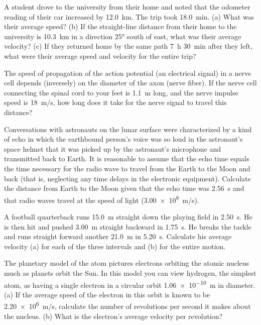 \documentclass[dvipsnames]{article}
\begin{document}
\begin{exercise}
    A student drove to the university from their home and noted that the odometer reading of their car increased by \SI{12.0}{km}. The trip took \SI{18.0}{min}. (a) What was their average speed? (b) If the straight-line distance from their home to the university is \SI{10.3}{km} in a direction \ang{25} south of east, what was their average velocity? (c) If they returned home by the same path \SI{7}{h} \SI{30}{min} after they left, what were their average speed and velocity for the entire trip?
\end{exercise}

\begin{exercise}
    The speed of propagation of the action potential (an electrical signal) in a nerve cell depends (inversely) on the diameter of the axon (nerve fiber). If the nerve cell connecting the spinal cord to your feet is \SI{1.1}{m} long, and the nerve impulse speed is \SI{18}{m/s}, how long does it take for the nerve signal to travel this distance?
\end{exercise}

\begin{exercise}
    Conversations with astronauts on the lunar surface were characterized by a kind of echo in which the earthbound person's voice was so loud in the astronaut's space helmet that it was picked up by the astronaut's microphone and transmitted back to Earth. It is reasonable to assume that the echo time equals the time necessary for the radio wave to travel from the Earth to the Moon and back (that is, neglecting any time delays in the electronic equipment). Calculate the distance from Earth to the Moon given that the echo time was \SI{2.56}{s} and that radio waves travel at the speed of light (\SI{3.00e8}{m/s}).
\end{exercise}

\begin{exercise}
    A football quarterback runs \SI{15.0}{m} straight down the playing field in \SI{2.50}{s}. He is then hit and pushed \SI{3.00}{m} straight backward in \SI{1.75}{s}. He breaks the tackle and runs straight forward another \SI{21.0}{m} in \SI{5.20}{s}. Calculate his average velocity (a) for each of the three intervals and (b) for the entire motion.
\end{exercise}

\begin{exercise}
    The planetary model of the atom pictures electrons orbiting the atomic nucleus much as planets orbit the Sun. In this model you can view hydrogen, the simplest atom, as having a single electron in a circular orbit \SI{1.06e-10}{m} in diameter. (a) If the average speed of the electron in this orbit is known to be \SI{2.20e6}{m/s}, calculate the number of revolutions per second it makes about the nucleus. (b) What is the electron's average velocity per revolution?
\end{exercise}
\end{document}

